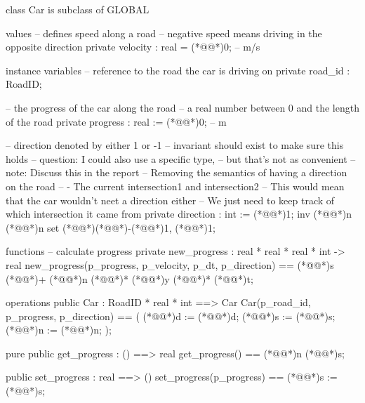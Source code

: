 \documentclass[a4paper]{article}
\begin{document}
\title{}
\author{}
\begin{vdm_al}
class Car is subclass of GLOBAL

values
    -- defines speed along a road
    -- negative speed means driving in the opposite direction
    private velocity : real = (*@@*)0; -- m/s

instance variables
    -- reference to the road the car is driving on
    private road_id : RoadID;

    -- the progress of the car along the road
    -- a real number between 0 and the length of the road
    private progress : real := (*@\vdmnotcovered{}@*)0; -- m

    -- direction denoted by either 1 or -1
    -- invariant should exist to make sure this holds
    -- question: I could also use a specific type,
    --           but that's not as convenient
    -- note: Discuss this in the report
    --       Removing the semantics of having a direction on the road
    --         - The current intersection1 and intersection2
    --       This would mean that the car wouldn't neet a direction either
    --       We just need to keep track of which intersection it came from
    private direction : int := (*@\vdmnotcovered{}@*)1;
    inv (*@@*)n (*@@*)n set (*@\vdmnotcovered{}@*){(*@\vdmnotcovered{}@*)-(*@\vdmnotcovered{}@*)1, (*@\vdmnotcovered{}@*)1};

functions
    -- calculate progress
    private new_progress : real * real * real * int -> real
    new_progress(p_progress, p_velocity, p_dt, p_direction) ==
        (*@@*)s (*@\vdmnotcovered{}@*)+ (*@@*)n (*@\vdmnotcovered{}@*)* (*@@*)y (*@\vdmnotcovered{}@*)* (*@@*)t;

operations
    public Car : RoadID * real * int ==> Car
    Car(p_road_id, p_progress, p_direction) == (
        (*@@*)d := (*@@*)d;
        (*@@*)s := (*@@*)s;
        (*@@*)n := (*@@*)n;
    );

    pure public get_progress : () ==> real
    get_progress() == (*@@*)n (*@@*)s;

    public set_progress : real ==> ()
    set_progress(p_progress) == (*@@*)s := (*@@*)s;


\end{vdm_al}
\end{document}
